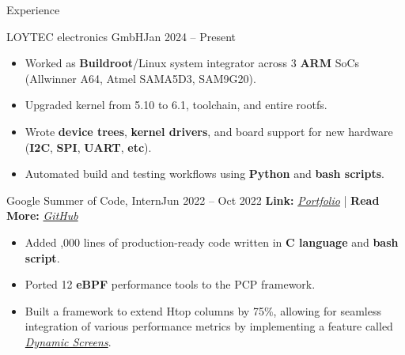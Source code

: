 \documentclass[]{Sohaib-Mohamed}
\begin{document}
\makeheader


\begin{cvsection}{Experience}

	\begin{cvsubsection}{LOYTEC electronics GmbH}{}{Jan 2024 -- Present}
      \begin{itemize}
         \item Worked as \textbf{Buildroot}/Linux system integrator across 3 \textbf{ARM} SoCs (Allwinner A64, Atmel SAMA5D3, SAM9G20).
         \item Upgraded kernel from 5.10 to 6.1, toolchain, and entire rootfs.
         \item Wrote \textbf{device trees}, \textbf{kernel drivers}, and board support for new hardware (\textbf{I2C}, \textbf{SPI}, \textbf{UART}, \textbf{etc}).
		 \item Automated build and testing workflows using \textbf{Python} and \textbf{bash scripts}.
      \end{itemize}
   \end{cvsubsection}

	\begin{cvsubsection}{Google Summer of Code, Intern}{}{Jun 2022 -- Oct 2022}
      \textbf{Link:} \href{https://gist.github.com/smalinux/2e9c5537fdac65501a655280352c9c15#google-summer-of-code-2022}{\textit{Portfolio}} | \textbf{Read More:} \href{https://gist.github.com/smalinux/e869b376b5c77cacdcda4cb14f027632}{\textit{GitHub}}
      \begin{itemize}
         \item Added ,000 lines of production-ready code written in \textbf{C language} and \textbf{bash script}.
         \item Ported 12 \textbf{eBPF} performance tools to the PCP framework.
         \item Built a framework to extend Htop columns by 75\%, allowing for seamless integration of various performance metrics by implementing a feature called \href{https://github.com/htop-dev/htop/pull/1102}{\textit{Dynamic Screens}}.
      \end{itemize}
   \end{cvsubsection}


\end{cvsection}
\end{document}
